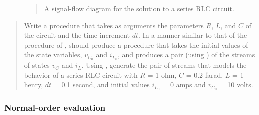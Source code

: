 \begin{figure}[tb]
\label{Figure 3.37}
\centering
\begin{comment}
\heading{Figure 3.37:} A signal-flow diagram for the solution to a series RLC circuit.

\begin{example}
                 +-------------+
+----------------+  scale: l/L |<--+
|                +-------------+   |
|                                  |
|                +-------------+   |  v_C
|       dv_C +-->|   integral  +---*------>
|            |   +-------------+
|            |        ^
|            |        | v_(C_0)
|            |
|            |   +-------------+
|            +---+ scale: -l/C |<--+
|                +-------------+   |
|  |\__                            |
+->|   \_  di_L  +-------------+   |  i_L
   | add_>------>|   integral  +---*------>
+->| __/         +-------------+   |
|  |/                 ^            |
|                     | i_(L_0)    |
|                                  |
|                +-------------+   |
+----------------+ scale: -R/L |<--+
                 +-------------+
\end{example}
\end{comment}

\begin{quote}
 A signal-flow diagram for the solution to a series RLC circuit.
\end{quote}
\end{figure}

\begin{quote}
Write a procedure  that takes as arguments the parameters \( R \),
\( L \), and \( C \) of the circuit and the time increment \( dt \).  In a manner
similar to that of the  procedure of , 
should produce a procedure that takes the initial values of the state
variables, \( v_{C_0} \) and \( i_{L_0} \), and produces a pair (using
) of the streams of states \( v_C \) and \( i_L \).  Using
, generate the pair of streams that models the behavior of a series
RLC circuit with \( R \) = 1 ohm, \( C \) = 0.2 farad, \( L \) = 1 henry, \( dt \)
= 0.1 second, and initial values \( i_{L_0} \) = 0 amps and \( v_{C_0} \) =
10 volts.
\end{quote}

\subsubsection*{Normal-order evaluation}


